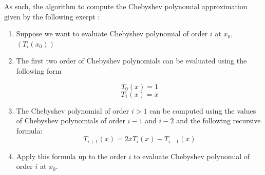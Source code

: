 As such, the algorithm to compute the Chebyshev polynomial approximation given by the following exerpt \cite{Chebyshev}:
\begin{enumerate}
\item Suppose we want to evaluate Chebyshev polynomial of order $i$ at $x_0$, $(T_i(x_0))$
\item The first two order of Chebyshev polynomials can be evaluated using the following form

\begin{equation}
T_0(x) = 1 
\end{equation}
\begin{equation}
T_1(x) = x
\end{equation}


\item The Chebyshev polynomial of order $i > 1$ can be computed using the values of Chebyshev polynomials of order $i-1$ and $i-2$ and the following recursive formula:
\begin{equation}
T_{i+1}(x) = 2xT_i(x) - T_{i-1}(x)
\end{equation}
\item Apply this formula up to the order $i$ to evaluate Chebyshev polynomial of order $i$ at $x_0$. 
\end{enumerate}

